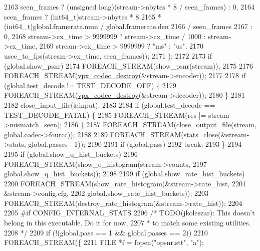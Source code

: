 \begin{DoxyCodeInclude}
{{{{{{{{{{{{{{{{{{{{{{{{{{{{{{{{{{{{{{{{{{{{{{{{{{{{{{{{{{{{{{{{{{{{2163                        seen\_frames ? (\textcolor{keywordtype}{unsigned} \textcolor{keywordtype}{long})(stream->nbytes * 8 / seen\_frames) : 0,
2164                        seen\_frames ? (int64\_t)stream->nbytes * 8
2165                        * (int64\_t)global.framerate.num / global.framerate.den
2166                        / seen\_frames
2167                        : 0,
2168                        stream->cx\_time > 9999999 ? stream->cx\_time / 1000 : stream->cx\_time,
2169                        stream->cx\_time > 9999999 ? \textcolor{stringliteral}{"ms"} : \textcolor{stringliteral}{"us"},
2170                        usec\_to\_fps(stream->cx\_time, seen\_frames));
2171                     );
2172 
2173     \textcolor{keywordflow}{if} (global.show\_psnr)
2174       FOREACH\_STREAM(show\_psnr(stream));
2175 
2176     FOREACH\_STREAM(\hyperlink{group__codec_ga6ae21d96909660d0ac978b59a863f53b}{vpx\_codec\_destroy}(&stream->encoder));
2177 
2178     \textcolor{keywordflow}{if} (global.test\_decode != TEST\_DECODE\_OFF) \{
2179       FOREACH\_STREAM(\hyperlink{group__codec_ga6ae21d96909660d0ac978b59a863f53b}{vpx\_codec\_destroy}(&stream->decoder));
2180     \}
2181 
2182     close\_input\_file(&input);
2183 
2184     \textcolor{keywordflow}{if} (global.test\_decode == TEST\_DECODE\_FATAL) \{
2185       FOREACH\_STREAM(res |= stream->mismatch\_seen);
2186     \}
2187     FOREACH\_STREAM(close\_output\_file(stream, global.codec->fourcc));
2188 
2189     FOREACH\_STREAM(stats\_close(&stream->stats, global.passes - 1));
2190 
2191     \textcolor{keywordflow}{if} (global.pass)
2192       \textcolor{keywordflow}{break};
2193   \}
2194 
2195   \textcolor{keywordflow}{if} (global.show\_q\_hist\_buckets)
2196     FOREACH\_STREAM(show\_q\_histogram(stream->counts,
2197                                     global.show\_q\_hist\_buckets));
2198 
2199   \textcolor{keywordflow}{if} (global.show\_rate\_hist\_buckets)
2200     FOREACH\_STREAM(show\_rate\_histogram(&stream->rate\_hist,
2201                                        &stream->config.cfg,
2202                                        global.show\_rate\_hist\_buckets));
2203   FOREACH\_STREAM(destroy\_rate\_histogram(&stream->rate\_hist));
2204 
2205 \textcolor{preprocessor}{#if CONFIG\_INTERNAL\_STATS}
2206   \textcolor{comment}{/* TODO(jkoleszar): This doesn't belong in this executable. Do it for now,}
2207 \textcolor{comment}{   * to match some existing utilities.}
2208 \textcolor{comment}{   */}
2209   \textcolor{keywordflow}{if} (!(global.pass == 1 && global.passes == 2))
2210     FOREACH\_STREAM(\{
2211       FILE *f = fopen(\textcolor{stringliteral}{"opsnr.stt"}, \textcolor{stringliteral}{"a"});
}}}}}}}}}}}}}}}}}}}}}}}}}}}}}}}}}}}}}}}}}}}}}}}}}}}}}}}}}}}}}}}}}}}}
\end{DoxyCodeInclude}
